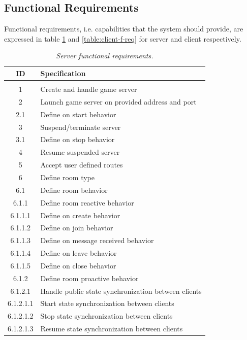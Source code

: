 \subsection{Functional Requirements}

Functional requirements, i.e. capabilities that the system should provide, are expressed in table \ref{table:server-f-req} and \ref{table:client-f-req} for server and client respectively.

\begin{center}
\begin{longtable}{|c|l|} 
  \caption{\textit{Server functional requirements.}} \label{table:server-f-req} \\
  
\hline
ID   &  Specification \\
\hline
\multicolumn{2}{|c|}{} \\
\hline
1         & Create and handle game server \\
2         & Launch game server on provided address and port \\
2.1       & Define on start behavior \\
3         & Suspend/terminate server \\
3.1       & Define on stop behavior \\
4         & Resume suspended server \\
5         & Accept user defined routes \\
6         & Define room type \\
6.1       & Define room behavior \\
6.1.1     & Define room reactive behavior \\
6.1.1.1   & Define on create behavior \\
6.1.1.2   & Define on join behavior \\
6.1.1.3   & Define on message received behavior \\
6.1.1.4   & Define on leave behavior \\
6.1.1.5   & Define on close behavior \\
6.1.2     & Define room proactive behavior \\
6.1.2.1   & Handle public state synchronization between clients \\
6.1.2.1.1 & Start state synchronization between clients \\
6.1.2.1.2 & Stop state synchronization between clients \\
6.1.2.1.3 & Resume state synchronization between clients \\

\end{longtable}
\end{center}
